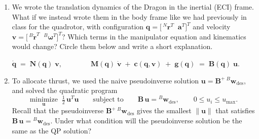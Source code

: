 \documentclass[11pt,letterpaper]{article}
\begin{document}
\begin{enumerate}[label=\textbf{\arabic*.}, leftmargin=*, itemsep=4pt, series=quiz]
\item We wrote the translation dynamics of the Dragon in the inertial (ECI) frame. What if we instead wrote them in the body frame like we had previously in class for the quadrotor, with configuration $\mathbf{q} = \bigl[\,{}^{N}\mathbf{r}^T\;\; \mathbf{a}^T\bigr]^T$ and velocity $\mathbf{v} = \bigl[\,{}^{B}\dot{\mathbf{r}}^T\;\; {}^{B}\boldsymbol{\omega}^T\bigr]^T$? Which terms in the manipulator equation and kinematics would change? Circle them below and write a short explanation.
\begin{center}
\Large
$\dot{\mathbf{q}} \;=\; \mathbf{N}(\mathbf{q})\;\mathbf{v},
\qquad\qquad
\mathbf{M}(\mathbf{q})\;\dot{\mathbf{v}} \;+\; \mathbf{c}(\mathbf{q},\mathbf{v}) \;+\; \mathbf{g}(\mathbf{q}) \;=\; \mathbf{B}(\mathbf{q})\;\mathbf{u}.$
\end{center}
\vspace{1.5in}

\item To allocate thrust, we used the naive pseudoinverse solution $\mathbf{u} = \mathbf{B}^{+}\,{}^{B}\mathbf{w}_{\text{des}}$, and solved the quadratic program
\[
\underset{\mathbf{u}}{\text{minimize}} \;\; \tfrac12\,\mathbf{u}^T\mathbf{u}
\qquad \text{subject to} \qquad
\mathbf{B}\,\mathbf{u} = {}^{B}\mathbf{w}_{\text{des}}, \qquad
0 \le u_i \le u_{\max}.
\]
Recall that the pseudoinverse $\mathbf{B}^{+}\,{}^{B}\mathbf{w}_{\text{des}}$ gives the smallest $\lVert\mathbf{u}\rVert$ that satisfies $\mathbf{B}\,\mathbf{u} = {}^{B}\mathbf{w}_{\text{des}}$. Under what condition will the pseudoinverse solution be the same as the QP solution?
\vspace*{\fill}

\end{enumerate}
\end{document}
